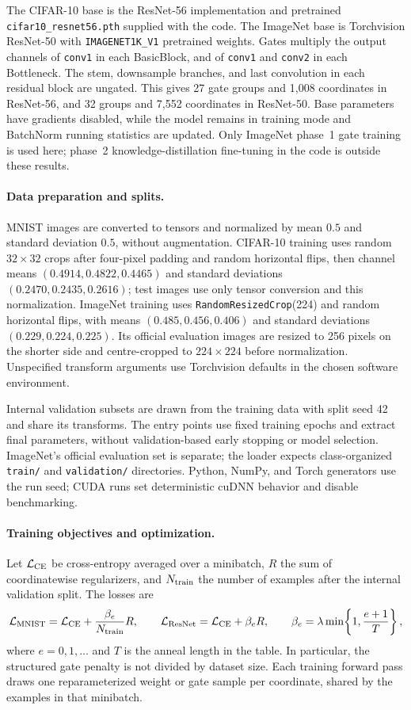 \documentclass[11pt,a4paper]{article}
\theoremstyle{compactplain}
\theoremstyle{compactdefinition}
\numberwithin{equation}{section}
\begin{document}
The CIFAR-10 base is the ResNet-56 implementation and pretrained
\texttt{cifar10\_resnet56.pth} supplied with the code. The ImageNet base is
Torchvision ResNet-50 with \texttt{IMAGENET1K\_V1} pretrained weights.
Gates multiply the output channels of \texttt{conv1} in each BasicBlock,
and of \texttt{conv1} and \texttt{conv2} in each Bottleneck. The stem,
downsample branches, and last convolution in each residual block are
ungated. This gives 27 gate groups and 1,008 coordinates in ResNet-56,
and 32 groups and 7,552 coordinates in ResNet-50. Base parameters have
gradients disabled, while the model remains in training mode and
BatchNorm running statistics are updated. Only ImageNet phase~1 gate
training is used here; phase~2 knowledge-distillation fine-tuning in the
code is outside these results.

\paragraph{Data preparation and splits.}
MNIST images are converted to tensors and normalized by mean \(0.5\)
and standard deviation \(0.5\), without augmentation. CIFAR-10 training
uses random \(32\times32\) crops after four-pixel padding and random
horizontal flips, then channel means \((0.4914,0.4822,0.4465)\) and
standard deviations \((0.2470,0.2435,0.2616)\); test images use only
tensor conversion and this normalization. ImageNet training uses
\texttt{RandomResizedCrop}(224) and random horizontal flips, with means
\((0.485,0.456,0.406)\) and standard deviations
\((0.229,0.224,0.225)\). Its official evaluation images are resized to
256 pixels on the shorter side and centre-cropped to \(224\times224\)
before normalization. Unspecified transform arguments use Torchvision
defaults in the chosen software environment.

Internal validation subsets are drawn from the training data with split
seed 42 and share its transforms. The entry points use fixed training
epochs and extract final parameters, without validation-based early
stopping or model selection. ImageNet's official evaluation set is
separate; the loader expects class-organized \texttt{train/} and
\texttt{validation/} directories. Python, NumPy, and Torch generators
use the run seed; CUDA runs set deterministic cuDNN behavior and
disable benchmarking.

\paragraph{Training objectives and optimization.}
Let \(\mathcal L_{\rm CE}\) be cross-entropy averaged over a minibatch,
\(R\) the sum of coordinatewise regularizers, and \(N_{\rm train}\)
the number of examples after the internal validation split. The losses are
\[
 \mathcal L_{\rm MNIST}
 =\mathcal L_{\rm CE}+\frac{\beta_e}{N_{\rm train}}R,
 \qquad
 \mathcal L_{\rm ResNet}
 =\mathcal L_{\rm CE}+\beta_e R,
 \qquad
 \beta_e=\lambda\min\!\left\{1,\frac{e+1}{T}\right\},
\]
where \(e=0,1,\ldots\) and \(T\) is the anneal length in the table.
In particular, the structured gate penalty is not divided by dataset
size. Each training forward pass draws one reparameterized weight or
gate sample per coordinate, shared by the examples in that minibatch.
\end{document}
